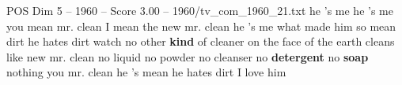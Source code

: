 \begin{textsample}{POS Dim 5 – 1960 – Score 3.00 – 1960/tv\_com\_1960\_21.txt}  \label{ex:f5_pos_084}
he 's me he 's me you mean mr. clean I mean the new mr. clean he 's me what made him so mean dirt he hates dirt watch no other \textbf{kind} of cleaner on the face of the earth cleans like new mr. clean no liquid no powder no cleanser no \textbf{detergent} no \textbf{soap} nothing you mr. clean he 's mean he hates dirt I love him

\end{textsample}
